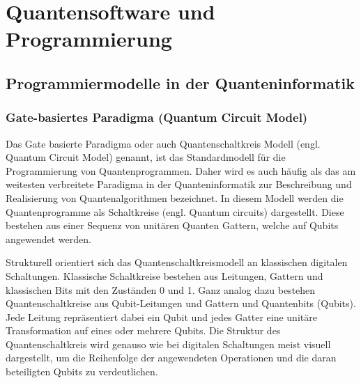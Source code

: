 \chapter{Quantensoftware und Programmierung}
\label{programming} %



\section{Programmiermodelle in der Quanteninformatik}
\label{programming-models}
\subsection{Gate-basiertes Paradigma (Quantum Circuit Model)}
Das Gate basierte Paradigma oder auch Quantenschaltkreis Modell (engl. Quantum Circuit Model) genannt, ist das Standardmodell für die Programmierung von Quantenprogrammen. Daher wird es auch häufig als das am weitesten verbreitete Paradigma in der Quanteninformatik zur Beschreibung und Realisierung von Quantenalgorithmen bezeichnet. In diesem Modell werden die Quantenprogramme als Schaltkreise (engl. Quantum circuits) dargestellt. Diese bestehen aus einer Sequenz von unitären Quanten Gattern, welche auf Qubits angewendet werden. 

Strukturell orientiert sich das Quantenschaltkreismodell an klassischen digitalen Schaltungen. Klassische Schaltkreise bestehen aus Leitungen, Gattern und klassischen Bits mit den Zuständen 0 und 1. Ganz analog dazu bestehen Quantenschaltkreise aus Qubit-Leitungen und Gattern und Quantenbits (Qubits). Jede Leitung repräsentiert dabei ein Qubit und jedes Gatter eine unitäre Transformation auf eines oder mehrere Qubits. Die Struktur des Quantenschaltkreis wird genauso wie bei digitalen Schaltungen meist visuell dargestellt, um die Reihenfolge der angewendeten Operationen und die daran beteiligten Qubits zu verdeutlichen. 

